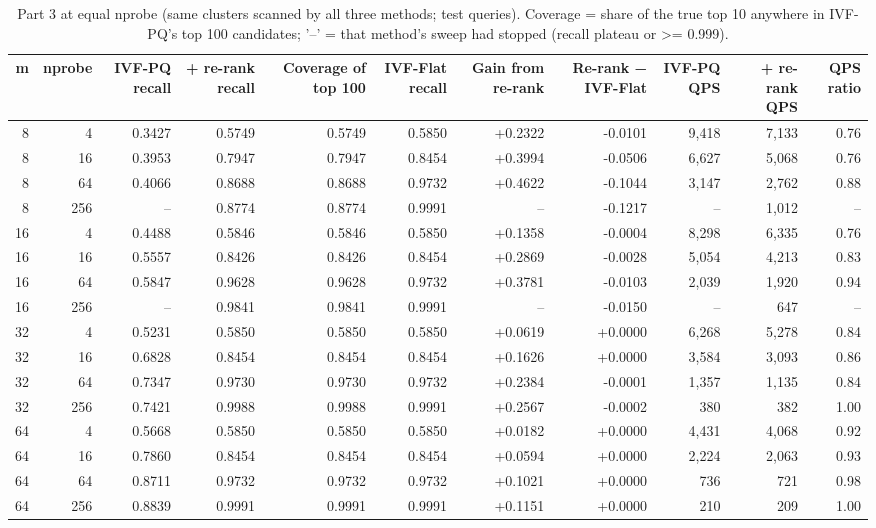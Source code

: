 \begin{table}[t]
\centering
\small
\caption{Part 3 at equal nprobe (same clusters scanned by all three methods; test queries). Coverage = share of the true top 10 anywhere in IVF-PQ's top 100 candidates; '--' = that method's sweep had stopped (recall plateau or >= 0.999).}
\label{tab:t3b_rerank_fixed_nprobe}
\begin{tabular}{rrrrrrrrrrr}
\toprule
m & nprobe & IVF-PQ recall & + re-rank recall & Coverage of top 100 & IVF-Flat recall & Gain from re-rank & Re-rank − IVF-Flat & IVF-PQ QPS & + re-rank QPS & QPS ratio \\
\midrule
8 & 4 & 0.3427 & 0.5749 & 0.5749 & 0.5850 & +0.2322 & -0.0101 & 9,418 & 7,133 & 0.76 \\
8 & 16 & 0.3953 & 0.7947 & 0.7947 & 0.8454 & +0.3994 & -0.0506 & 6,627 & 5,068 & 0.76 \\
8 & 64 & 0.4066 & 0.8688 & 0.8688 & 0.9732 & +0.4622 & -0.1044 & 3,147 & 2,762 & 0.88 \\
8 & 256 & -- & 0.8774 & 0.8774 & 0.9991 & -- & -0.1217 & -- & 1,012 & -- \\
16 & 4 & 0.4488 & 0.5846 & 0.5846 & 0.5850 & +0.1358 & -0.0004 & 8,298 & 6,335 & 0.76 \\
16 & 16 & 0.5557 & 0.8426 & 0.8426 & 0.8454 & +0.2869 & -0.0028 & 5,054 & 4,213 & 0.83 \\
16 & 64 & 0.5847 & 0.9628 & 0.9628 & 0.9732 & +0.3781 & -0.0103 & 2,039 & 1,920 & 0.94 \\
16 & 256 & -- & 0.9841 & 0.9841 & 0.9991 & -- & -0.0150 & -- & 647 & -- \\
32 & 4 & 0.5231 & 0.5850 & 0.5850 & 0.5850 & +0.0619 & +0.0000 & 6,268 & 5,278 & 0.84 \\
32 & 16 & 0.6828 & 0.8454 & 0.8454 & 0.8454 & +0.1626 & +0.0000 & 3,584 & 3,093 & 0.86 \\
32 & 64 & 0.7347 & 0.9730 & 0.9730 & 0.9732 & +0.2384 & -0.0001 & 1,357 & 1,135 & 0.84 \\
32 & 256 & 0.7421 & 0.9988 & 0.9988 & 0.9991 & +0.2567 & -0.0002 & 380 & 382 & 1.00 \\
64 & 4 & 0.5668 & 0.5850 & 0.5850 & 0.5850 & +0.0182 & +0.0000 & 4,431 & 4,068 & 0.92 \\
64 & 16 & 0.7860 & 0.8454 & 0.8454 & 0.8454 & +0.0594 & +0.0000 & 2,224 & 2,063 & 0.93 \\
64 & 64 & 0.8711 & 0.9732 & 0.9732 & 0.9732 & +0.1021 & +0.0000 & 736 & 721 & 0.98 \\
64 & 256 & 0.8839 & 0.9991 & 0.9991 & 0.9991 & +0.1151 & +0.0000 & 210 & 209 & 1.00 \\
\bottomrule
\end{tabular}
\end{table}
